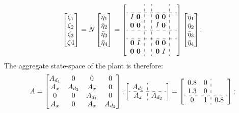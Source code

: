 \[
\begin{bmatrix}
    \zeta_{1} \\ \zeta_{2} \\ \zeta_{3} \\ \zeta{4}
\end{bmatrix} = N \begin{bmatrix}
    \bar{\eta}_{1} \\ \bar{\eta}_{2} \\ \bar{\eta}_{3} \\ \bar{\eta}_{4}
\end{bmatrix} = 
\left[
\begin{array}{c:c:c:c}
    \empty & \empty & \empty& \empty \\
    \hdashline
    I\ \mathbf{0} & \empty & \mathbf{0}\ \mathbf{0} & \empty\\
    \mathbf{0}\ \mathbf{0} & \empty & I\ \mathbf{0} & \empty\\
    \hdashline
    \empty & \empty & \empty& \empty \\
    \hdashline
    \mathbf{0}\ I & \empty & \mathbf{0}\ \mathbf{0} & \empty\\
    \mathbf{0}\ \mathbf{0} & \empty & \mathbf{0}\ I & \empty\\
\end{array}\right]\begin{bmatrix}
    \bar{\eta}_{1} \\ \bar{\eta}_{2} \\ \bar{\eta}_{3} \\ \bar{\eta}_{4}
\end{bmatrix}.
\]
The aggregate state-space of the plant is therefore: 
\begin{equation*}
A = 
\begin{bmatrix}
A_{d_1} & 0 & 0 & 0\\
A_{x} & A_{d_2} & A_{x} & 0\\
0 & 0 & A_{d_1} & 0\\
A_{x} & 0 & A_{x} & A_{d_2}
\end{bmatrix},
\left[
\begin{array}{c:c}
    A_{d_1} &  \\
    \hdashline
    A_x & A_{d_2}\\
\end{array}\right]
= 
\left[
\begin{array}{cc:c}
    0.8 & 0 & \empty \\
    1.3 & 0 & \empty \\
    \hdashline
    0 & 1 & 0.8\\
\end{array}\right];
\end{equation*}

